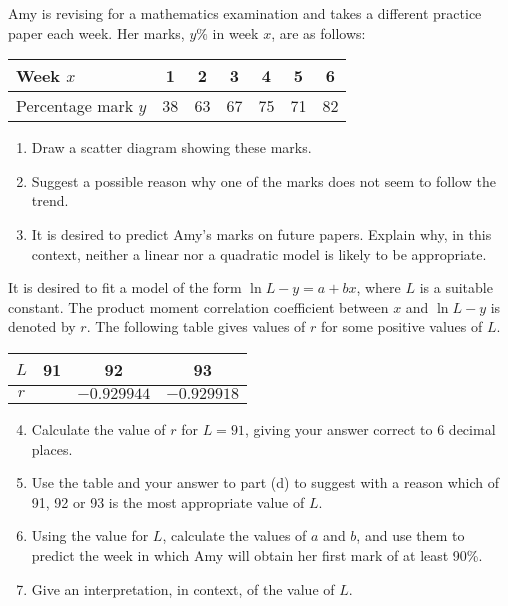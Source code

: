 \begin{problem}
    Amy is revising for a mathematics examination and takes a different practice paper each week. Her marks, $y \%$ in week $x$, are as follows:

    \begin{table}[H]
        \centering
        \begin{tabular}{|l|c|c|c|c|c|c|}
            \hline
            Week $x$ & 1 & 2 & 3 & 4 & 5 & 6 \\ \hline 
            Percentage mark $y$ & 38 & 63 & 67 & 75 & 71 & 82 \\ \hline
        \end{tabular}
    \end{table}

    \begin{enumerate}
        \item Draw a scatter diagram showing these marks.
        \item Suggest a possible reason why one of the marks does not seem to follow the trend.
        \item It is desired to predict Amy's marks on future papers. Explain why, in this context, neither a linear nor a quadratic model is likely to be appropriate.
    \end{enumerate}
    
    It is desired to fit a model of the form $\ln{L-y}=a+bx$, where $L$ is a suitable constant. The product moment correlation coefficient between $x$ and $\ln{L-y}$ is denoted by $r$. The following table gives values of $r$ for some positive values of $L$.

    \begin{table}[H]
        \centering
        \begin{tabular}{|c|c|c|c|} \hline
            $L$ & 91 & 92 & 93 \\ \hline
            $r$ & & $-0.929944$ & $-0.929918$ \\ \hline
        \end{tabular}
    \end{table}

    \begin{enumerate}
        \setcounter{enumi}{3}
        \item Calculate the value of $r$ for $L=91$, giving your answer correct to 6 decimal places.
        \item Use the table and your answer to part (d) to suggest with a reason which of 91, 92 or 93 is the most appropriate value of $L$.
        \item Using the value for $L$, calculate the values of $a$ and $b$, and use them to predict the week in which Amy will obtain her first mark of at least 90\%.
        \item Give an interpretation, in context, of the value of $L$.
    \end{enumerate}
\end{problem}
